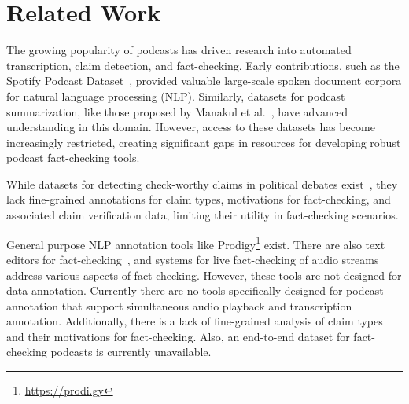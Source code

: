 \section{Related Work}

The growing popularity of podcasts has driven research into automated transcription, claim detection, and fact-checking. Early contributions, such as the Spotify Podcast Dataset~\cite{clifton2020100}, provided valuable large-scale spoken document corpora for natural language processing (NLP). Similarly, datasets for podcast summarization, like those proposed by Manakul et al.~\cite{manakul2022podcast}, have advanced understanding in this domain. However, access to these datasets has become increasingly restricted, creating significant gaps in resources for developing robust podcast fact-checking tools.

While datasets for detecting check-worthy claims in political debates exist~\cite{ivanov2024detecting,hassan2017claimbuster}, they lack fine-grained annotations for claim types, motivations for fact-checking, and associated claim verification data, limiting their utility in fact-checking scenarios.

General purpose NLP annotation tools like Prodigy\footnote{\url{https://prodi.gy}} exist. There are also text editors for fact-checking~\cite{setty2024factcheck}, and systems for live fact-checking of audio streams~\cite{setty2024livefc} address various aspects of fact-checking. However, these tools are not designed for data annotation. Currently there are no tools specifically designed for podcast annotation that support simultaneous audio playback and transcription annotation. Additionally, there is a lack of fine-grained analysis of claim types and their motivations for fact-checking. Also, an end-to-end dataset for fact-checking podcasts is currently unavailable.
